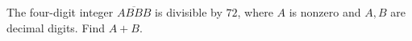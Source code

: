 The four-digit integer $\overline{ABBB}$ is divisible by $72$, where $A$ is nonzero and $A,B$ are decimal digits. Find $A+B$.
